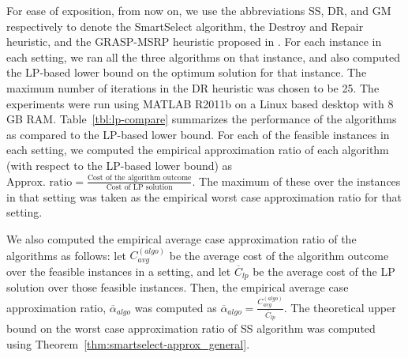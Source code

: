 \documentclass[conference]{IEEEtran}
\begin{document}
For ease of exposition, from now on, we use the abbreviations SS, DR, and GM respectively to denote the SmartSelect algorithm, the Destroy and Repair heuristic, and the GRASP-MSRP heuristic proposed in \cite{sitanayah}. For each instance in each setting, we ran all the three algorithms on that instance, and also computed the LP-based lower bound on the optimum solution for that instance. The maximum number of iterations in the DR heuristic was chosen to be 25. The experiments were run using MATLAB R2011b on a Linux based desktop with 8 GB RAM. Table~\ref{tbl:lp-compare} summarizes the performance of the algorithms as compared to the LP-based lower bound. For each of the feasible instances in each setting, we computed the empirical approximation ratio of each algorithm (with respect to the LP-based lower bound) as $\text{Approx. ratio} = \frac{\text{Cost of the algorithm outcome}}{\text{Cost of LP solution}}$. 
The maximum of these over the instances in that setting was taken as the empirical worst case approximation ratio for that setting. 

We also computed the empirical average case approximation ratio of the algorithms as follows: let $C^{(algo)}_{avg}$ be the average cost of the algorithm outcome over the feasible instances in a setting, and let $\overline{C}_{lp}$ be the average cost of the LP solution over those feasible instances. Then, the empirical average case approximation ratio, $\overline{\alpha}_{algo}$ was computed as $\overline{\alpha}_{algo}=\frac{C^{(algo)}_{avg}}{\overline{C}_{lp}}$. The theoretical upper bound on the worst case approximation ratio of SS algorithm was computed using Theorem~\ref{thm:smartselect-approx_general}.
\end{document}
